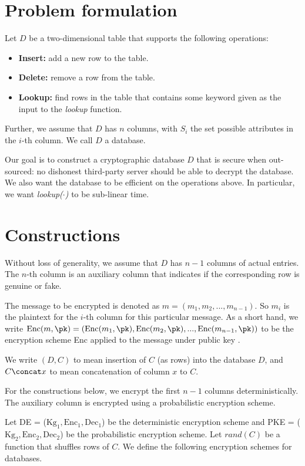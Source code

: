 \documentclass[10pt]{article}
\begin{document}
\section{Problem formulation}
Let $D$ be a two-dimensional table that supports the following operations:
\begin{itemize}
\item \textbf{Insert: } add a new row to the table.
\item \textbf{Delete: } remove a row from the table.
\item \textbf{Lookup: } find rows in the table that contains some keyword given as the input to the \textit{lookup} function.
\end{itemize}

Further, we assume that $D$ has $n$ columns, with $S_i$ the set possible attributes in the $i$-th column. We call $D$ a database.

Our goal is to construct a cryptographic database $D$ that is secure when out-sourced: no dishonest third-party server should be able to decrypt the database. We also want the database to be efficient on the operations above. In particular, we want \textit{lookup($\cdot$)} to be sub-linear time.


\section{Constructions}
Without loss of generality, we assume that $D$ has $n-1$ columns of actual entries. The $n$-th column is an auxiliary column that indicates if the corresponding row is genuine or fake.

The message to be encrypted is denoted as $m = (m_1, m_2,..., m_{n-1})$. So $m_i$ is the plaintext for the $i$-th column for this particular message. As a short hand, we write $\text{Enc}(m, \pk) = (\text{Enc}(m_1, \pk), \text{Enc}(m_2, \pk),...,\text{Enc}(m_{n-1}, \pk))$ to be the encryption scheme Enc applied to the message under public key \pk.

We write $(D, C)$ to mean insertion of $C$ (as rows) into the database $D$, and $C \concat x$ to mean concatenation of column $x$ to $C$.

For the constructions below, we encrypt the first $n-1$ columns deterministically. The auxiliary column is encrypted using a probabilistic encryption scheme.

Let DE = ($\text{Kg}_1, \text{Enc}_1, \text{Dec}_1$) be the deterministic encryption scheme and PKE = ($\text{Kg}_2, \text{Enc}_2, \text{Dec}_2$) be the probabilistic encryption scheme. Let $rand(C)$ be a function that shuffles rows of $C$. We define the following encryption schemes for databases.
\end{document}
